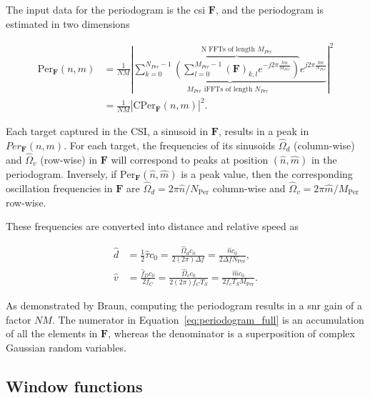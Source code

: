     The input data for the periodogram is the \gls{csi} $\mathbf F$, and the periodogram is estimated in two dimensions

    \begin{equation}
    	\label{eq:periodogram_full}
    	\begin{aligned}
    		\text{Per}_{\mathbf F}(n,m) &= \frac{1}{NM} \left| \underbrace{ \sum_{k=0}^{N_{Per}-1}  \overbrace{\left(  \sum_{l=0}^{M_{Per}-1} (\mathbf F)_{k,l} e^{-j2\pi \frac{lm}{M_{Per}}} \right)}^{\text{N FFTs of length $M_{Per}$}}  e^{j2\pi\frac{kn}{N_{Per}}}}_{ \text{$M_{Per}$ iFFTs of length $N_{Per}$ }} \right| ^ 2 \\
    		&= \frac{1}{NM} \left| \text{CPer}_{\mathbf F}(n,m) \right| ^ 2.
    	\end{aligned}
    \end{equation}


    Each target captured in the CSI, \ie a sinusoid in $\mathbf F$, results in a peak in $Per_{\mathbf F}(n,m)$.
    For each target, the frequencies of its sinusoids $\hat{\Omega}_d$ (column-wise) and $\hat{\Omega}_v$ (row-wise) in $\mathbf F$ will correspond to peaks at position $(\hat{n}, \hat{m})$ in the periodogram. Inversely, if $\text{Per}_{\bm{F}}(\hat{n},\hat{m})$ is a peak value, then the corresponding oscillation frequencies in $\mathbf F$ are $\hat{\Omega}_d = 2\pi\hat{n}/N_{\text{Per}}$ column-wise and $\hat{\Omega}_v = 2\pi\hat{m}/M_{\text{Per}}$ row-wise.
    
    These frequencies are converted into distance and relative speed as

    \begin{align*}
        \hat{d} &= \frac{1}{2}\hat{\tau}c_0 = \frac{\hat{\Omega}_d c_0}{2 (2\pi) \Delta f} = \frac{\hat{n}c_0}{2\Delta f N_\text{Per}}, \\
        \hat{v} &= \frac{\hat{f}_D c_0 }{2 f_C} = \frac{\hat{\Omega}_v c_0}{2(2\pi)f_CT_S} =  \frac{\hat{m}c_0}{2f_cT_S M_{\text{Per}}}.
    \end{align*}
    
    
    

    As demonstrated by Braun, computing the periodogram results in a \gls{snr} gain of a factor $NM$. The numerator in Equation~\eqref{eq:periodogram_full} is an accumulation of all the elements in $\mathbf F$, whereas the denominator is a superposition of complex Gaussian random variables.
    
    \newpage
	\subsection{Window functions}
	
